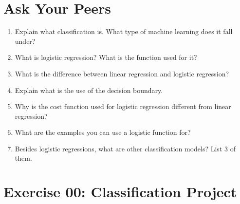 \documentclass{42-en}
\begin{document}
\chapter{Ask Your Peers}

\begin{enumerate}
    \item Explain what classification is. What type of machine learning does it fall under?
    \item What is logistic regression? What is the function used for it?
    \item What is the difference between linear regression and logistic regression?
    \item Explain what is the use of the decision boundary.
    \item Why is the cost function used for logistic regression different from linear regression?
    \item What are the examples you can use a logistic function for?
    \item Besides logistic regressions, what are other classification models? List 3 of them.
\end{enumerate}

\startexercices



\chapter{Exercise 00: Classification Project}
\makeheaderfiles
\end{document}
